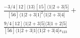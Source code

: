 \documentclass[varwidth, border=5pt]{standalone}
\begin{document}
\begin{my}
$\begin{gathered}
\scriptscriptstyle\frac{-3/4[12]⟨13⟩[15]⟨1|2+3|5]}{[56]⟨1|2+3|1]^2⟨1|2+3|4]}+\\
\scriptscriptstyle\frac{9/4[12]⟨1|2+3|5]⟨3|1+2|5]}{[56]⟨1|2+3|1]⟨1|2+3|4]s_{123}}\phantom{+}
\end{gathered}$
\end{my}
\end{document}
